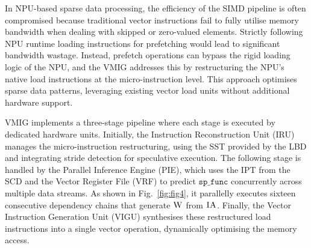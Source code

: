 In NPU-based sparse data processing, the efficiency of the SIMD pipeline is often compromised because traditional vector instructions fail to fully utilise memory bandwidth when dealing with skipped or zero-valued elements. 
Strictly following NPU runtime loading instructions for prefetching would lead to significant bandwidth wastage. 
Instead, prefetch operations can bypass the rigid loading logic of the NPU, and the VMIG addresses this by restructuring the NPU's native load instructions at the micro-instruction level. 
This approach optimises sparse data patterns, leveraging existing vector load units without additional hardware support. 


VMIG implements a three-stage pipeline where each stage is executed by dedicated hardware units. 
Initially, the Instruction Reconstruction Unit (IRU) manages the micro-instruction restructuring, using the SST provided by the LBD and integrating stride detection for speculative execution. 
The following stage is handled by the Parallel Inference Engine (PIE), which uses the IPT from the SCD and the Vector Register File (VRF) to predict $\texttt{sp\_func}$ concurrently across multiple data streams. As shown in Fig.~\ref{fig:fig4}, it parallelly executes sixteen consecutive dependency chains that generate $\mbox{\sc W}$ from $\mbox{\sc IA}$.
Finally, the Vector Instruction Generation Unit (VIGU) synthesises these restructured load instructions into a single vector operation, dynamically optimising the memory access. 

